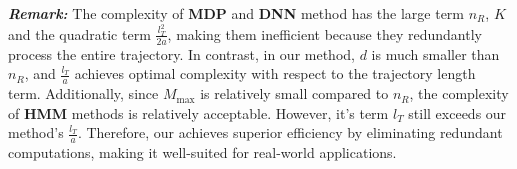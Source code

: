 \textbf{\textit{Remark:}} The complexity of \textbf{MDP} and \textbf{DNN} method has the large term $n_R$, $K$ and the quadratic term $\frac{l_T^2}{2a}$, making them inefficient because they redundantly process the entire trajectory. In contrast, in our method, $d$ is much smaller than $n_R$, and $\frac{l_T}{a}$ achieves optimal complexity with respect to the trajectory length term. Additionally, since $M_{\max}$ is relatively small compared to $n_R$, the complexity of \textbf{HMM} methods is relatively acceptable. However, it's term $l_T$ still exceeds our method’s  $\frac{l_T}{a}$.
Therefore, our \textbf{\modelName} achieves superior efficiency by eliminating redundant computations, making it well-suited for real-world applications.